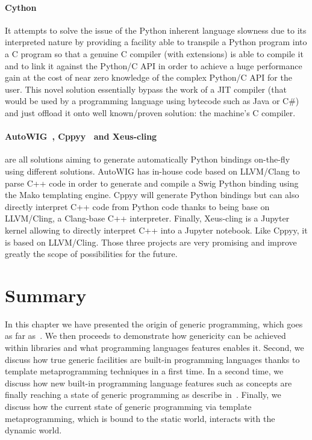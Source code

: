 \paragraph{Cython~\parencite{behnel.2010.cython}} It attempts to solve the issue of the Python inherent language
slowness due to its interpreted nature by providing a facility able to transpile a Python program into a C program so
that a genuine C compiler (with extensions) is able to compile it and to link it against the Python/C API in order to
achieve a huge performance gain at the cost of near zero knowledge of the complex Python/C API for the user. This novel
solution essentially bypass the work of a JIT compiler (that would be used by a programming language using bytecode such
as Java or C\#) and just offload it onto well known/proven solution: the machine's C compiler.

\paragraph{AutoWIG~\parencite{fernique.2018.autowig}, Cppyy~\parencite{wimtlplavrijsen.2016.cppyy} and
  Xeus-cling~\parencite{quantstack.2021.xeus-cling}} are all solutions aiming to generate automatically Python bindings
on-the-fly using different solutions. AutoWIG has in-house code based on LLVM/Clang to parse C++ code in order to
generate and compile a Swig Python binding using the Mako templating engine. Cppyy will generate Python bindings but can
also directly interpret C++ code from Python code thanks to being base on LLVM/Cling, a Clang-base C++ interpreter.
Finally, Xeus-cling is a Jupyter~\parencite{kluyver.2016.jupyter} kernel allowing to directly interpret C++ into a
Jupyter notebook. Like Cppyy, it is based on LLVM/Cling. Those three projects are very promising and improve greatly the
scope of possibilities for the future.


\section{Summary}

In this chapter we have presented the origin of generic programming, which goes as far
as~. We then proceeds to demonstrate how genericity can be achieved within libraries
and what programming languages features enables it. Second, we discuss how true generic facilities are built-in
programming languages thanks to template metaprogramming techniques in a first time. In a second time, we discuss how
new built-in programming language features such as concepts are finally reaching a state of generic programming as
describe in~\parencite{dehnert.1998.fundamentals}. Finally, we discuss how the current state of generic programming via
template metaprogramming, which is bound to the static world, interacts with the dynamic world.


